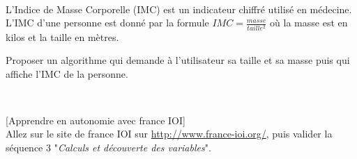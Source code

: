 \documentclass[a4paper,12pt]{article}
\newcommand{\numero}{7}                                    %
\begin{document}
\exo{}  ~\\ 
  L'Indice de Masse Corporelle (IMC) est un indicateur chiffré utilisé en médecine. L'IMC d'une personne est donné par la formule $IMC = \frac{masse}{taille ^2}$  où la masse est en kilos et la taille en mètres. 

Proposer un algorithme qui demande à l'utilisateur sa taille et sa masse puis qui affiche l'IMC de la personne. 
\begin{correction}
	~\\ 
	
\end{correction}
\finexo

\exo{}[Apprendre en  autonomie avec france IOI]  ~\\ 
Allez sur le site de france IOI sur \url{http://www.france-ioi.org/}, puis valider la séquence 3 "\textit{Calculs et découverte des variables}".
\finexo

		\newpage
		\setcounter{page}{1}
		\setcounter{section}{\numero}
		

		\section{}
	
\end{document}
